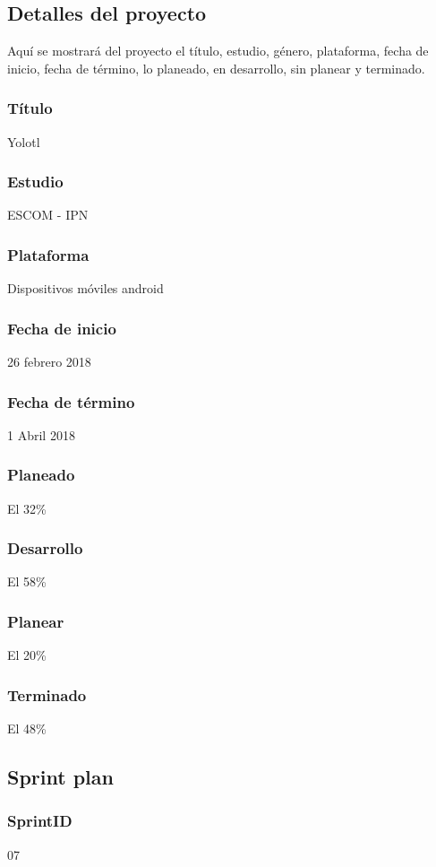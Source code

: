 \subsection{Detalles del proyecto}
Aquí se mostrará del proyecto el título, estudio, género, plataforma, fecha de inicio, fecha de término, lo planeado, en desarrollo, sin planear y terminado.
\\
\subsubsection{Título}
Yolotl

\subsubsection{Estudio}
ESCOM - IPN

\subsubsection{Plataforma}
Dispositivos móviles android

\subsubsection{Fecha de inicio}
26 febrero 2018
\subsubsection{Fecha de término}
1 Abril 2018
\subsubsection{Planeado}
El 32\%
\subsubsection{Desarrollo}
El 58\%
\subsubsection{Planear}
El 20\%
\subsubsection{Terminado}
El 48\%



\subsection{Sprint plan}
\subsubsection{SprintID}
07
